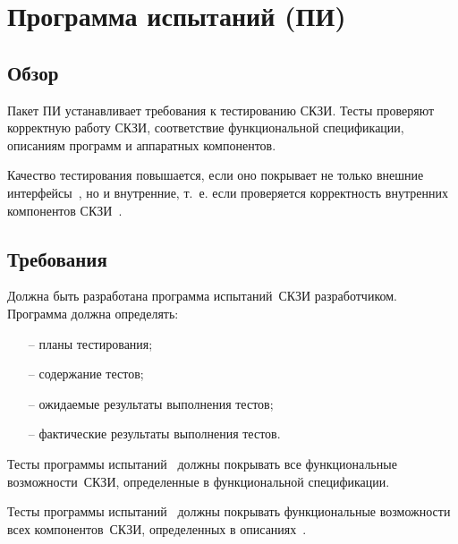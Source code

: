 \section{Программа испытаний (ПИ)}\label{TE}

\subsection{Обзор}\label{TE.Intro}

Пакет ПИ устанавливает требования к тестированию СКЗИ.
%
Тесты проверяют корректную работу СКЗИ, 
соответствие функциональной спецификации,
описаниям программ и аппаратных компонентов.

Качество тестирования повышается, если оно покрывает не только внешние 
интерфейсы~, но и внутренние, 
т.~е. если проверяется корректность внутренних компонентов 
СКЗИ~. 

\subsection{Требования}\label{TE.Reqs}

\label{R.TE.Prg} %
Должна быть разработана программа испытаний~СКЗИ разработчиком.
Программа должна определять:
\begin{itemize}
\item[--]
планы тестирования;
\item[--]
содержание тестов;
\item[--]
ожидаемые результаты выполнения тестов;
\item[--]
фактические результаты выполнения тестов.
\end{itemize}

\label{R.TE.Coverage} %
Тесты программы испытаний~ должны 
покрывать все функциональные возможности~СКЗИ, 
определенные в функциональной спецификации.

\label{R.TE.Deep} %
Тесты программы испытаний~ должны 
покрывать функциональные возможности всех компонентов~СКЗИ, 
определенных в описаниях~.


